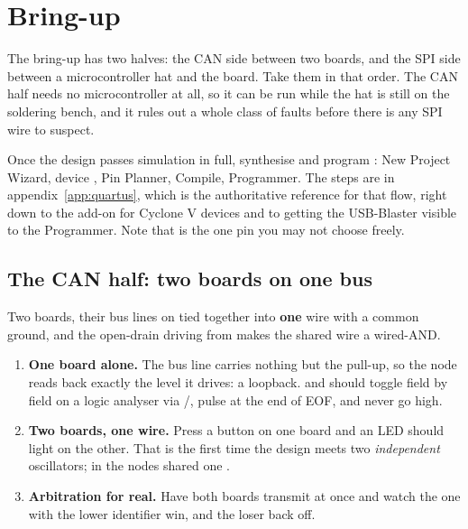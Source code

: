 \section{Bring-up}
\label{c19:sec:bringup}

The bring-up has two halves: the CAN side between two boards, and the SPI side between a
microcontroller hat and the board. Take them in that order. The CAN half needs no microcontroller at
all, so it can be run while the hat is still on the soldering bench, and it rules out a whole class of
faults before there is any SPI wire to suspect.

Once the design passes simulation in full, synthesise and program : New Project
Wizard, device , Pin Planner, Compile, Programmer. The steps are in
appendix~\ref{app:quartus}, which is the authoritative reference for that flow, right down to the
add-on for Cyclone V devices and to getting the USB-Blaster visible to the Programmer. Note that
 is the one pin you may not choose freely.

\subsection*{The CAN half: two boards on one bus}
Two boards, their bus lines on  tied together into \textbf{one} wire with a common
ground, and the open-drain driving from  makes the shared wire a wired-AND.

\begin{enumerate}
  \item \textbf{One board alone.} The bus line carries nothing but the pull-up, so the node reads back
    exactly the level it drives: a loopback.  and  should toggle field by
    field on a logic analyser via /,  pulse at the end
    of EOF, and  never go high.
  \item \textbf{Two boards, one wire.} Press a button on one board and an LED should light on the
    other. That is the first time the design meets two \emph{independent} oscillators; in
     the nodes shared one .
  \item \textbf{Arbitration for real.} Have both boards transmit at once and watch the one with the
    lower identifier win, and the loser back off.
\end{enumerate}

